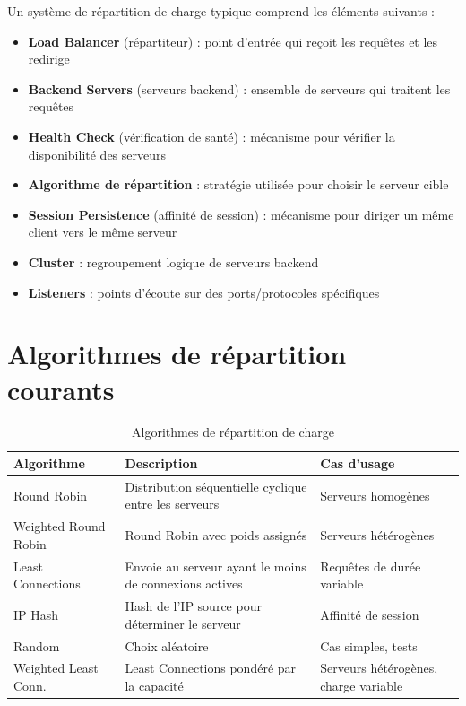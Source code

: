 \documentclass[12pt,a4paper]{report}
\begin{document}
Un système de répartition de charge typique comprend les éléments suivants :

\begin{itemize}
  \item \textbf{Load Balancer} (répartiteur) : point d'entrée qui reçoit les requêtes et les redirige
  \item \textbf{Backend Servers} (serveurs backend) : ensemble de serveurs qui traitent les requêtes
  \item \textbf{Health Check} (vérification de santé) : mécanisme pour vérifier la disponibilité des serveurs
  \item \textbf{Algorithme de répartition} : stratégie utilisée pour choisir le serveur cible
  \item \textbf{Session Persistence} (affinité de session) : mécanisme pour diriger un même client vers le même serveur
  \item \textbf{Cluster} : regroupement logique de serveurs backend
  \item \textbf{Listeners} : points d'écoute sur des ports/protocoles spécifiques
\end{itemize}

\section{Algorithmes de répartition courants}

\begin{table}[H]
\centering
\caption{Algorithmes de répartition de charge}
\begin{tabular}{|p{4cm}|p{5.5cm}|p{4.5cm}|}
\hline
\textbf{Algorithme} & \textbf{Description} & \textbf{Cas d'usage} \\
\hline
Round Robin & Distribution séquentielle cyclique entre les serveurs & Serveurs homogènes \\
\hline
Weighted Round Robin & Round Robin avec poids assignés & Serveurs hétérogènes \\
\hline
Least Connections & Envoie au serveur ayant le moins de connexions actives & Requêtes de durée variable \\
\hline
IP Hash & Hash de l'IP source pour déterminer le serveur & Affinité de session \\
\hline
Random & Choix aléatoire & Cas simples, tests \\
\hline
Weighted Least Conn. & Least Connections pondéré par la capacité & Serveurs hétérogènes, charge variable \\
\hline
\end{tabular}
\end{table}
\end{document}
